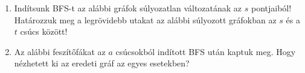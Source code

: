 \documentclass[a4paper,12pt]{article}
\begin{document}
    \noindent{}
    \noindent{}
    \begin{enumerate}
        \item Indítsunk BFS-t az alábbi gráfok súlyozatlan változatának az $s$ pontjaiból! Határozzuk meg a legrövidebb utakat az alábbi súlyozott gráfokban az $s$ és a $t$ csúcs között!
        \begin{figure}[!h]
            \centering \hfill
            \hfill
            \hfill \hfill
        \end{figure}
        \item Az alábbi feszítőfákat az $a$ csúcsokból indított BFS után kaptuk meg. Hogy nézhetett ki az eredeti gráf az egyes esetekben? 
        \begin{figure}[!h]
            \centering
            \begin{subfigure}{0.2\textwidth}
                \centering
                
            \end{subfigure}
            \begin{subfigure}{0.2\textwidth}
                \centering		
                
            \end{subfigure}
            \begin{subfigure}{0.2\textwidth}
                \centering
                
            \end{subfigure}
            \begin{subfigure}{0.2\textwidth}
                \centering
                
            \end{subfigure}
        \end{figure}

        

\end{enumerate}
\end{document}
